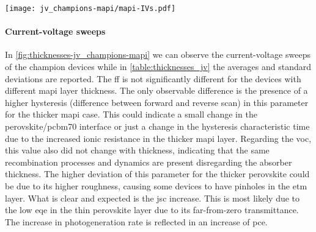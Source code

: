 \begin{SCfigure}
	\centering
	\texttt{[image: jv\_champions-mapi/mapi-IVs.pdf]}
	\label{fig:thicknesses-jv_champions-mapi}
\end{SCfigure}

\paragraph{Current-voltage sweeps}
In \cref{fig:thicknesses-jv_champions-mapi} we can observe the current-voltage sweeps of the champion devices while in \cref{table:thicknesses_jv} the averages and standard deviations are reported.
The \gls{ff} is not significantly different for the devices with different \gls{mapi} layer thickness.
The only observable difference is the presence of a higher hysteresis (difference between forward and reverse scan) in this parameter for the thicker \gls{mapi} case.
This could indicate a small change in the perovskite\-/\gls{pcbm70} interface or just a change in the hysteresis characteristic time due to the increased ionic resistance in the thicker \gls{mapi} layer. 
Regarding the \gls{voc}, this value also did not change with thickness, indicating that the same recombination processes and dynamics are present disregarding the absorber thickness.
The higher deviation of this parameter for the thicker perovskite could be due to its higher roughness, causing some devices to have pinholes in the \gls{etm} layer.
What is clear and expected is the \gls{jsc} increase.
This is most likely due to the low \gls{eqe} in the thin perovskite layer due to its far\hyp{}from\hyp{}zero transmittance.
The increase in photogeneration rate is reflected in an increase of \gls{pce}.

